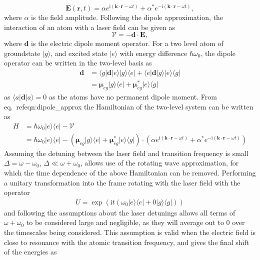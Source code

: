 \begin{equation}
    \mathbf{E}(\mathbf{r},t) = \alpha e^{\textrm{i}\left(\mathbf{k}\cdot\mathbf{r} - \omega t\right)} + \alpha^{*} e^{-\textrm{i}\left(\mathbf{k}\cdot\mathbf{r} - \omega t\right)},
\end{equation}
where $\alpha$ is the field amplitude. Following the dipole approximation, the interaction of an atom with a laser field can be given as
\begin{equation}
\mathcal{V} = -{\mathbf{d}}\cdot {\mathbf{E}},
\end{equation}
where ${\mathbf{d}}$ is the electric dipole moment operator. For a two level atom of groundstate $| g \rangle$, and excited state $| e \rangle$ with energy difference $\hbar \omega_0$, the dipole operator can be written in the two-level basis as
\begin{align}\label{eqn:dipole_approx}
\mathbf{d} &= \langle g|\mathbf{d}|e \rangle | g \rangle \langle e | + \langle e|\mathbf{d}|g \rangle | e \rangle \langle g | \nonumber \\
&= \boldsymbol{\mu}_{eg} | g \rangle \langle e | + \boldsymbol{\mu}_{eg}^{*} | e \rangle \langle g |
\end{align}
as $\langle a|\mathbf{d}|a \rangle = 0$ as the atoms have no permanent dipole moment. From eq.~ref{eqn:dipole_approx} the Hamiltonian of the two-level system can be written as
\begin{align}
    H &= \hbar\omega_0 |e\rangle\langle e |  - \mathcal{V} \nonumber \\
      &=  \hbar\omega_0 |e\rangle\langle e | - (\boldsymbol{\mu}_{eg} | g \rangle \langle e | + \boldsymbol{\mu}_{eg}^{*} | e \rangle \langle g |)\cdot (\alpha e^{\textrm{i}\left(\mathbf{k}\cdot\mathbf{r} - \omega t\right)} + \alpha^{*} e^{-\textrm{i}\left(\mathbf{k}\cdot\mathbf{r} - \omega t\right)})
\end{align}
Assuming the detuning between the laser field and transition frequency is small $\Delta = \omega - \omega_0$, $\Delta \ll \omega + \omega_0$, allows use of the rotating wave approximation, for which the time dependence of the above Hamiltonian can be removed. Performing a unitary transformation into the frame rotating with the laser field with the operator
\begin{align}
    U = \exp\left({\textrm{i}t}(\omega_0|e\rangle\langle e| + 0|g\rangle\langle g|)\right)
\end{align}
and following the assumptions about the laser detunings allows all terms of $\omega + \omega_0$ to be considered large and negligible, as they will average out to 0 over the timescales being considered. This assumption is valid when the electric field is close to resonance with the atomic transition frequency, and gives the final shift of the energies as

